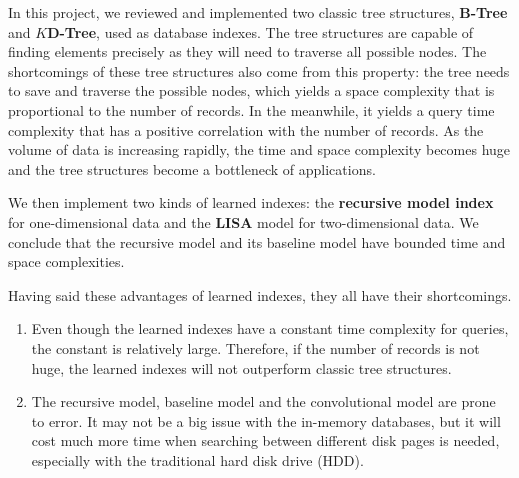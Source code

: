In this project, we reviewed and implemented two classic tree structures, \textbf{B-Tree} and \textbf{$K$D-Tree}, used as database indexes. The tree structures are capable of finding elements precisely as they will need to traverse all possible nodes. The shortcomings of these tree structures also come from this property: the tree needs to save and traverse the possible nodes, which yields a space complexity that is proportional to the number of records. In the meanwhile, it yields a query time complexity that has a positive correlation with the number of records. As the volume of data is increasing rapidly, the time and space complexity becomes huge and the tree structures become a bottleneck of applications.

We then implement two kinds of learned indexes: the \textbf{recursive model index} for one-dimensional data and the \textbf{LISA} model for two-dimensional data. We conclude that the recursive model and its baseline model have bounded time and space complexities.


Having said these advantages of learned indexes, they all have their shortcomings.

\begin{enumerate}
	\item Even though the learned indexes have a constant time complexity for queries, the constant is relatively large. Therefore, if the number of records is not huge, the learned indexes will not outperform classic tree structures.
	\item The recursive model, baseline model and the convolutional model are prone to error. It may not be a big issue with the in-memory databases, but it will cost much more time when searching between different disk pages is needed, especially with the traditional hard disk drive (HDD).
\end{enumerate}